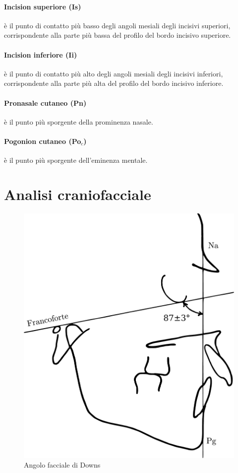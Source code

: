 \paragraph{Incision superiore (Is)} è il punto di contatto più basso degli angoli mesiali degli incisivi superiori, corrispondente alla parte più bassa del profilo del bordo incisivo superiore.

\paragraph{Incision inferiore (Ii)} è il punto di contatto più alto degli angoli mesiali degli incisivi inferiori, corrispondente alla parte più alta del profilo del bordo incisivo inferiore.

\paragraph{Pronasale cutaneo (Pn)} è il punto più sporgente della prominenza nasale.

\paragraph{Pogonion cutaneo (Po$_c$)} è il punto più sporgente dell'eminenza mentale.

\section{Analisi craniofacciale}

\begin{figure}[h!]
 \centering
 \includegraphics[width=.5\textwidth]{./images/ricketts_facciale_downs.pdf}
 \caption{Angolo facciale di Downs}
 \label{fig:ricketts_facciale_downs}
\end{figure}

